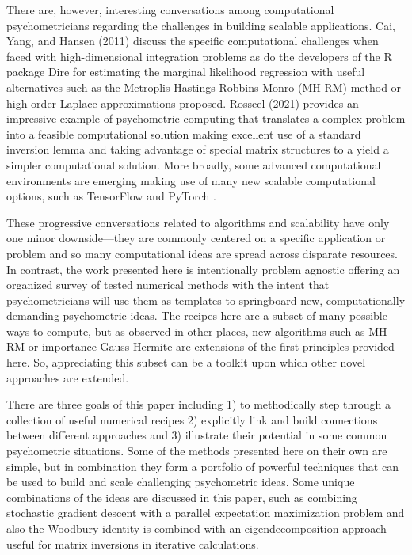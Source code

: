 \documentclass[12pt]{article}
\begin{document}
There are, however, interesting conversations among computational psychometricians regarding the challenges in building scalable applications. Cai, Yang, and Hansen (2011) discuss the specific computational challenges when faced with high-dimensional integration problems as do the developers of the R package Dire \cite{dire} for estimating the marginal likelihood regression \cite{mislevy} with useful alternatives such as the Metroplis-Hastings Robbins-Monro (MH-RM) method \cite{cai:fisher} or high-order Laplace approximations \cite{bjorn} proposed. Rosseel (2021) provides an impressive example of psychometric computing that translates a complex problem into a feasible computational solution making excellent use of a standard inversion lemma and taking advantage of special matrix structures to a yield a simpler computational solution. More broadly, some advanced computational environments are emerging making use of many new scalable computational options, such as TensorFlow \cite{tensorflow2015-whitepaper} and PyTorch \cite{pytorch}.    \nocite{cai} \nocite{psych3020017}

These progressive conversations related to algorithms and scalability have only one minor downside---they are commonly centered on a specific application or problem and so many computational ideas are spread across disparate resources. In contrast, the work presented here is intentionally problem agnostic offering an organized survey of tested numerical methods with the intent that psychometricians will use them as templates to springboard new, computationally demanding psychometric ideas. The recipes here are a subset of many possible ways to compute, but as observed in other places, new algorithms such as MH-RM \cite{cai:fisher} or importance Gauss-Hermite \cite{elvira} are extensions of the first principles provided here. So, appreciating this subset can be a toolkit upon which other novel approaches are extended.

There are three goals of this paper including 1) to methodically step through a collection of useful numerical recipes 2) explicitly link and build connections between different approaches and 3) illustrate their potential in some common psychometric situations. Some of the methods presented here on their own are simple, but in combination they form a portfolio of powerful techniques that can be used to build and scale challenging psychometric ideas. Some unique combinations of the ideas are discussed in this paper, such as combining stochastic gradient descent with a parallel expectation maximization problem and also the Woodbury identity is combined with an eigendecomposition approach useful for matrix inversions in iterative calculations. 
\end{document}
